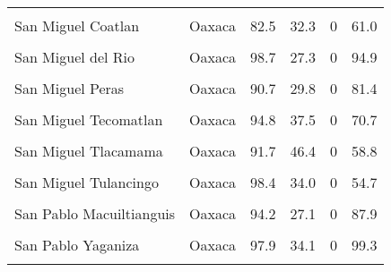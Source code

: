 \documentclass[
]{report}
\begin{document}
\begin{longtable}[t]{llrrrr}
\cellcolor{gray!6}{San Miguel Amatlan} & \cellcolor{gray!6}{Oaxaca} & \cellcolor{gray!6}{98.8} & \cellcolor{gray!6}{42.2} & \cellcolor{gray!6}{0} & \cellcolor{gray!6}{91.1}\\
\addlinespace
San Miguel Coatlan & Oaxaca & 82.5 & 32.3 & 0 & 61.0\\
\cellcolor{gray!6}{San Miguel Chimalapa} & \cellcolor{gray!6}{Oaxaca} & \cellcolor{gray!6}{88.2} & \cellcolor{gray!6}{36.7} & \cellcolor{gray!6}{0} & \cellcolor{gray!6}{92.5}\\
San Miguel del Rio & Oaxaca & 98.7 & 27.3 & 0 & 94.9\\
\cellcolor{gray!6}{San Miguel El Grande} & \cellcolor{gray!6}{Oaxaca} & \cellcolor{gray!6}{97.0} & \cellcolor{gray!6}{35.1} & \cellcolor{gray!6}{0} & \cellcolor{gray!6}{96.1}\\
San Miguel Peras & Oaxaca & 90.7 & 29.8 & 0 & 81.4\\
\addlinespace
\cellcolor{gray!6}{San Miguel Suchixtepec} & \cellcolor{gray!6}{Oaxaca} & \cellcolor{gray!6}{89.3} & \cellcolor{gray!6}{39.3} & \cellcolor{gray!6}{0} & \cellcolor{gray!6}{96.0}\\
San Miguel Tecomatlan & Oaxaca & 94.8 & 37.5 & 0 & 70.7\\
\cellcolor{gray!6}{San Miguel Tenango} & \cellcolor{gray!6}{Oaxaca} & \cellcolor{gray!6}{94.7} & \cellcolor{gray!6}{40.4} & \cellcolor{gray!6}{0} & \cellcolor{gray!6}{61.1}\\
San Miguel Tlacamama & Oaxaca & 91.7 & 46.4 & 0 & 58.8\\
\cellcolor{gray!6}{San Miguel Tlacotepec} & \cellcolor{gray!6}{Oaxaca} & \cellcolor{gray!6}{89.7} & \cellcolor{gray!6}{31.3} & \cellcolor{gray!6}{0} & \cellcolor{gray!6}{87.6}\\
\addlinespace
San Miguel Tulancingo & Oaxaca & 98.4 & 34.0 & 0 & 54.7\\
\cellcolor{gray!6}{San Miguel Yotao} & \cellcolor{gray!6}{Oaxaca} & \cellcolor{gray!6}{93.8} & \cellcolor{gray!6}{49.9} & \cellcolor{gray!6}{0} & \cellcolor{gray!6}{100.0}\\
San Pablo Macuiltianguis & Oaxaca & 94.2 & 27.1 & 0 & 87.9\\
\cellcolor{gray!6}{San Pablo Villa de Mitla} & \cellcolor{gray!6}{Oaxaca} & \cellcolor{gray!6}{94.5} & \cellcolor{gray!6}{49.2} & \cellcolor{gray!6}{0} & \cellcolor{gray!6}{70.7}\\
San Pablo Yaganiza & Oaxaca & 97.9 & 34.1 & 0 & 99.3\\
\addlinespace
\cellcolor{gray!6}{San Pedro Amuzgos} & \cellcolor{gray!6}{Oaxaca} & \cellcolor{gray!6}{83.4} & \cellcolor{gray!6}{43.4} & \cellcolor{gray!6}{0} & \cellcolor{gray!6}{93.2}\\

\end{longtable}
\end{document}
